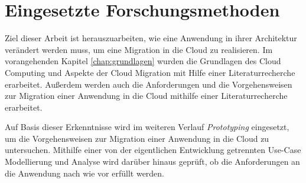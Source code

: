 
\chapter{Eingesetzte Forschungsmethoden}
Ziel dieser Arbeit ist herauszuarbeiten, wie eine Anwendung in ihrer Architektur verändert werden muss, um eine Migration in die Cloud zu realisieren. Im vorangehenden Kapitel \ref{chap:grundlagen} wurden die Grundlagen des Cloud Computing und Aspekte der Cloud Migration mit Hilfe einer Literaturrecherche erarbeitet. Außerdem werden auch die Anforderungen und die Vorgehensweisen zur Migration einer Anwendung in die Cloud mithilfe einer Literaturrecherche erarbeitet.

Auf Basis dieser Erkenntnisse wird im weiteren Verlauf \textit{Prototyping} eingesetzt, um die Vorgehensweisen zur Migration einer Anwendung in die Cloud zu untersuchen. Mithilfe einer von der eigentlichen Entwicklung getrennten Use-Case Modellierung und Analyse wird darüber hinaus geprüft, ob die Anforderungen an die Anwendung nach wie vor erfüllt werden.



